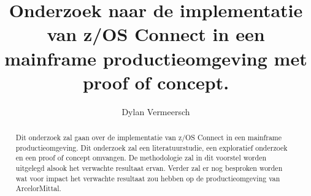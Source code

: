 \documentclass{hogent-article}
\title{Onderzoek naar de implementatie van z/OS Connect in een mainframe productieomgeving met proof of concept.}
\author{Dylan Vermeersch}
\begin{document}
\begin{abstract}
  Dit onderzoek zal gaan over de implementatie van z/OS Connect in een mainframe productieomgeving. Dit onderzoek zal een literatuurstudie, een exploratief onderzoek en een proof of concept omvangen. De methodologie zal in dit voorstel worden uitgelegd alsook het verwachte resultaat ervan. Verder zal er nog besproken worden wat voor impact het verwachte resultaat zou hebben op de productieomgeving van ArcelorMittal.
\end{abstract}

\tableofcontents



\printbibliography[heading=bibintoc]
\end{document}
